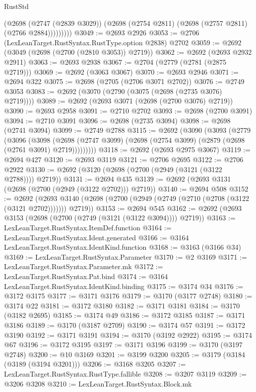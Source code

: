 \begin{lexlean}{RustStd}
\begin{coremodule}
              (@2698
                (@2747 (@2839 @3029))
                (@2698 (@2754 @2811) (@2698 (@2757 @2811) (@2766 @2884)))))))))
@3049 := @2693 @2926
@3053 := @2706 (LexLeanTarget.RustSyntax.RustType.option @2838) @2702
@3059 := @2692 (@3049 (@2698 (@2700 (@2810 @3053)) @2719))
@3062 := @2692 (@2693 @2932 @2911)
@3063 := @2693 @2938
@3067 := @2704 (@2779 (@2781 (@2875 @2719)))
@3069 := @2692 (@3063 @3067)
@3070 := @2693 @2946
@3071 := @2694 @322
@3075 := @2698 (@2705 (@2706 @3071 @2702))
@3076 := @2749 @3053
@3083 := @2692 (@3070 (@2790 (@3075 (@2698 (@2735 @3076) @2719))))
@3089 := @2692 (@2693 @3071 (@2698 (@2700 @3076) @2719))
@3090 := @2693 @2958
@3091 := @2710 @2702
@3093 := @2698 (@2700 @3091)
@3094 := @2710 @3091
@3096 := @2698 (@2735 @3094)
@3098 := @2698 (@2741 @3094)
@3099 := @2749 @2788
@3115 := @2692
    (@3090
      (@3093
        (@2779
          (@3096
            (@3098
              (@2698 (@2747 @3099) (@2698 (@2754 @3099) (@2879 (@2698 (@2761 @3091) @2719)))))))))
@3118 := @2692 (@2693 @2975 @3067)
@3119 := @2694 @427
@3120 := @2693 @3119
@3121 := @2706 @2695
@3122 := @2706 @2922
@3130 := @2692 (@3120 (@2698 (@2700 (@2949 (@3121 (@3122 @2788)))) @2719))
@3131 := @2694 @435
@3139 := @2692 (@2693 @3131 (@2698 (@2700 (@2949 (@3122 @2702))) @2719))
@3140 := @2694 @508
@3152 := @2692
    (@2693 @3140 (@2698 (@2700 (@2949 (@2749 (@2710 (@2708 (@3122 (@3121 @2702))))))) @2719))
@3153 := @2694 @545
@3162 := @2692 (@2693 @3153 (@2698 (@2700 (@2749 (@3121 (@3122 @3094)))) @2719))
@3163 := LexLeanTarget.RustSyntax.ItemDef.function
@3164 := LexLeanTarget.RustSyntax.Ident.generated
@3166 := @3164 LexLeanTarget.RustSyntax.IdentKind.function
@3168 := @3163 (@3166 @34)
@3169 := LexLeanTarget.RustSyntax.Parameter
@3170 := @2 @3169
@3171 := LexLeanTarget.RustSyntax.Parameter.mk
@3172 := LexLeanTarget.RustSyntax.Pat.bind
@3174 := @3164 LexLeanTarget.RustSyntax.IdentKind.binding
@3175 := @3174 @34
@3176 := @3172 @3175
@3177 := @3171 @3176
@3179 := @3170 (@3177 @2748)
@3180 := @3174 @22
@3181 := @3172 @3180
@3182 := @3171 @3181
@3184 := @3170 (@3182 @2695)
@3185 := @3174 @49
@3186 := @3172 @3185
@3187 := @3171 @3186
@3189 := @3170 (@3187 @2709)
@3190 := @3174 @57
@3191 := @3172 @3190
@3192 := @3171 @3191
@3194 := @3170 (@3192 @2922)
@3195 := @3174 @67
@3196 := @3172 @3195
@3197 := @3171 @3196
@3199 := @3170 (@3197 @2748)
@3200 := @10 @3169
@3201 := @3199 @3200
@3205 := @3179 (@3184 (@3189 (@3194 @3201)))
@3206 := @3168 @3205
@3207 := LexLeanTarget.RustSyntax.RustType.fallible
@3208 := @3207 @3119
@3209 := @3206 @3208
@3210 := LexLeanTarget.RustSyntax.Block.mk

\end{coremodule}
\end{lexlean}
